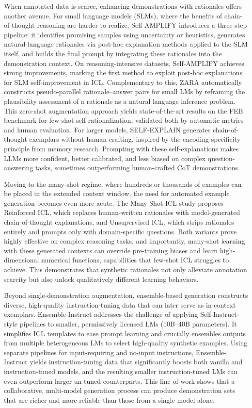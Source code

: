 \documentclass[11pt]{article}
\begin{document}
When annotated data is scarce, enhancing demonstrations with rationales offers another avenue. For small language models (SLMs), where the benefits of chain-of-thought reasoning are harder to realize, Self-AMPLIFY \cite{ref98} introduces a three-step pipeline: it identifies promising samples using uncertainty or heuristics, generates natural-language rationales via post-hoc explanation methods applied to the SLM itself, and builds the final prompt by integrating these rationales into the demonstration context. On reasoning-intensive datasets, Self-AMPLIFY achieves strong improvements, marking the first method to exploit post-hoc explanations for SLM self-improvement in ICL. Complementary to this, ZARA \cite{ref99} automatically constructs pseudo-parallel rationale--answer pairs for small LMs by reframing the plausibility assessment of a rationale as a natural language inference problem. This zero-shot augmentation approach yields state-of-the-art results on the FEB benchmark for few-shot self-rationalization, validated both by automatic metrics and human evaluation. For larger models, SELF-EXPLAIN \cite{ref100} generates chain-of-thought exemplars without human crafting, inspired by the encoding-specificity principle from memory research. Prompting with these self-explanations makes LLMs more confident, better calibrated, and less biased on complex question-answering tasks, sometimes outperforming human-crafted CoT demonstrations.

Moving to the many-shot regime, where hundreds or thousands of examples can be placed in the extended context window, the need for automated example generation becomes even more acute. The Many-Shot ICL study \cite{ref101} proposes Reinforced ICL, which replaces human-written rationales with model-generated chain-of-thought explanations, and Unsupervised ICL, which strips rationales entirely and prompts only with domain-specific questions. Both variants prove highly effective on complex reasoning tasks, and importantly, many-shot learning with these generated contexts can override pre-training biases and learn high-dimensional numerical functions, capabilities that few-shot ICL struggles to achieve. This demonstrates that synthetic rationales not only alleviate annotation scarcity but also unlock qualitatively different learning behaviors.

Beyond single-demonstration augmentation, ensemble-based generation constructs diverse, high-quality instruction-tuning data that can later serve as in-context exemplars. Ensemble-Instruct \cite{ref102} addresses the challenge of applying Self-Instruct-style pipelines to smaller, permissively licensed LMs (10B--40B parameters). It simplifies ICL templates to ease prompt learning and crucially ensembles outputs from multiple heterogeneous LMs to select high-quality synthetic examples. Using separate pipelines for input-requiring and no-input instructions, Ensemble-Instruct yields instruction-tuning data that significantly boosts both vanilla and instruction-tuned models, and the resulting smaller instruction-tuned LMs can even outperform larger un-tuned counterparts. This line of work shows that a collaborative, multi-model generation process can produce demonstration sets that are richer and more reliable than those from a single model alone.
\end{document}
